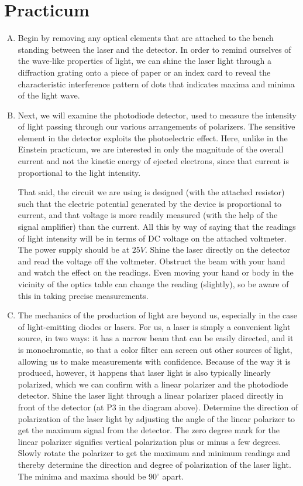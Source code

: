 \section*{Practicum}

\begin{enumerate}[(A)]
	\item Begin by removing any optical elements that are attached to the bench standing between the laser and the detector. In order to remind ourselves of the wave-like properties of light, we can shine the laser light through a diffraction grating onto a piece of paper or an index card to reveal the characteristic interference pattern of dots that indicates maxima and minima of the light wave.

\item Next, we will examine the photodiode detector, used to measure the intensity of light passing through our various arrangements of polarizers. The sensitive element in the detector exploits the photoelectric effect. Here, unlike in the Einstein practicum, we are interested in only the magnitude of the overall current and not the kinetic energy of ejected electrons, since that current is proportional to the light intensity.

That said, the circuit we are using is designed (with the attached resistor) such that the electric potential generated by the device is proportional to current, and that voltage is more readily measured (with the help of the signal amplifier) than the current. All this by way of saying that the readings of light intensity will be in terms of DC voltage on the attached voltmeter. The power supply should be at $25V$. Shine the laser directly on the detector and read the voltage off the voltmeter. Obstruct the beam with your hand and watch the effect on the readings. Even moving your hand or body in the vicinity of the optics table can change the reading (slightly), so be aware of this in taking precise measurements.

\item The mechanics of the production of light are beyond us, especially in the case of light-emitting diodes or lasers. For us, a laser is simply a convenient light source, in two ways: it has a narrow beam that can be easily directed, and it is monochromatic, so that a color filter can screen out other sources of light, allowing us to make measurements with confidence. Because of the way it is produced, however, it happens that laser light is also typically linearly polarized, which we can confirm with a linear polarizer and the photodiode detector. Shine the laser light through a linear polarizer placed directly in front of the detector (at P3 in the diagram above). Determine the direction of polarization of the laser light by adjusting the angle of the linear polarizer to get the maximum signal from the detector.  The zero degree mark for the linear polarizer signifies vertical polarization plus or minus a few degrees.
Slowly rotate the polarizer to get the maximum and minimum readings and thereby determine the direction and degree of polarization of the laser light. The minima and maxima should be 90$^\circ$ apart.



\end{enumerate}
